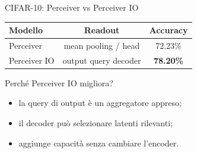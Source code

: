 \documentclass[aspectratio=169,10pt]{beamer}
\newcommand{\good}[1]{\textcolor{AccentGreen}{\textbf{#1}}}
\begin{document}
\begin{frame}{CIFAR-10: Perceiver vs Perceiver IO}
\small
\begin{center}
\begin{tabular}{lcc}
\toprule
\textbf{Modello} & \textbf{Readout} & \textbf{Accuracy} \\
\midrule
Perceiver & mean pooling / head & 72.23\% \\
Perceiver IO & output query decoder & \good{78.20\%} \\
\bottomrule
\end{tabular}
\end{center}

\begin{exampleblock}{Perché Perceiver IO migliora?}
\begin{itemize}
  \item la query di output è un aggregatore appreso;
  \item il decoder può selezionare latenti rilevanti;
  \item aggiunge capacità senza cambiare l'encoder.
\end{itemize}
\end{exampleblock}
\end{frame}
\end{document}
